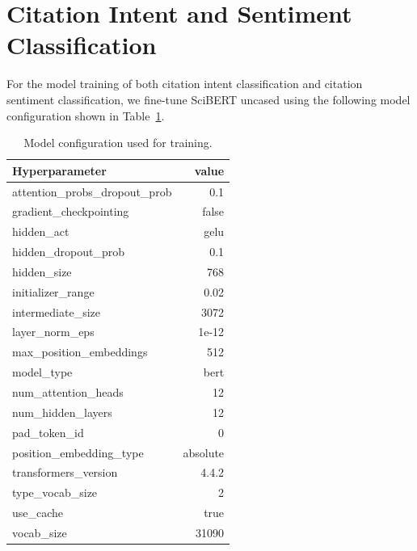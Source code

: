 \section{Citation Intent and Sentiment Classification}\label{app:classifcation}

For the model training of both citation intent classification and citation sentiment classification, we fine-tune SciBERT uncased using the following model configuration shown in Table~\ref{tab:modelconf}.

\begin{table}
\caption[Model configuration used for training]{Model configuration used for training.}
 \label{tab:modelconf}
  \centering
  \begin{small}
 \begin{threeparttable}
 \begin{tabular}{lr}
 \toprule
   Hyperparameter & value \\
   \midrule
  attention\_probs\_dropout\_prob &  0.1 \\
  gradient\_checkpointing &  false \\
  hidden\_act &  gelu \\
  hidden\_dropout\_prob &  0.1 \\
  hidden\_size &  768 \\
  initializer\_range &  0.02 \\
  intermediate\_size &  3072 \\
  layer\_norm\_eps &  1e-12 \\
  max\_position\_embeddings &  512 \\
  model\_type &  bert \\
  num\_attention\_heads &  12 \\
  num\_hidden\_layers &  12 \\
  pad\_token\_id &  0 \\
  position\_embedding\_type &  absolute \\
  transformers\_version &  4.4.2 \\
  type\_vocab\_size &  2 \\
  use\_cache &  true \\
  vocab\_size &  31090 \\
   \bottomrule
 \end{tabular}
\end{threeparttable}
  \end{small}
\end{table}

